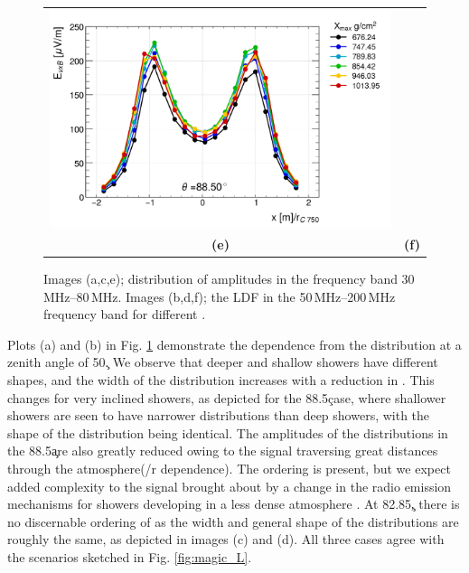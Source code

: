 \begin{figure}[h!]
\begin{tabular}{cc}
    \includegraphics[width=0.45\linewidth]{88zenLDF200.png} \\
\textbf{(e)} & \textbf{(f)} \\
\end{tabular}
\caption{Images (a,c,e); distribution of amplitudes in the frequency band 30\,MHz--80\,MHz. Images (b,d,f); the LDF in the 50\,MHz--200\,MHz frequency band for different \xmax. }
\label{fig:LDFamps}
\end{figure}

Plots (a) and (b) in Fig. \ref{fig:LDFamps} demonstrate the \xmax dependence from the distribution at a zenith angle of 50\c. We observe that deeper and shallow showers have different shapes, and the width of the distribution increases with a reduction in \xmax. This changes for very inclined showers, as depicted for the 88.5\c case, where shallower showers are seen to have narrower distributions than deep showers, with the shape of the distribution being identical. The amplitudes of the distributions in the 88.5\c are also greatly reduced owing to the signal traversing great distances through the atmosphere(/r dependence). The \xmax ordering is present, but we expect added complexity to the signal brought about by a change in the radio emission mechanisms for showers developing in a less dense atmosphere \cite{}. At 82.85\c, there is no discernable ordering of \xmax as the width and general shape of the distributions are roughly the same, as depicted in images (c) and (d). All three cases agree with the scenarios sketched in Fig. \ref{fig:magic_L}.

